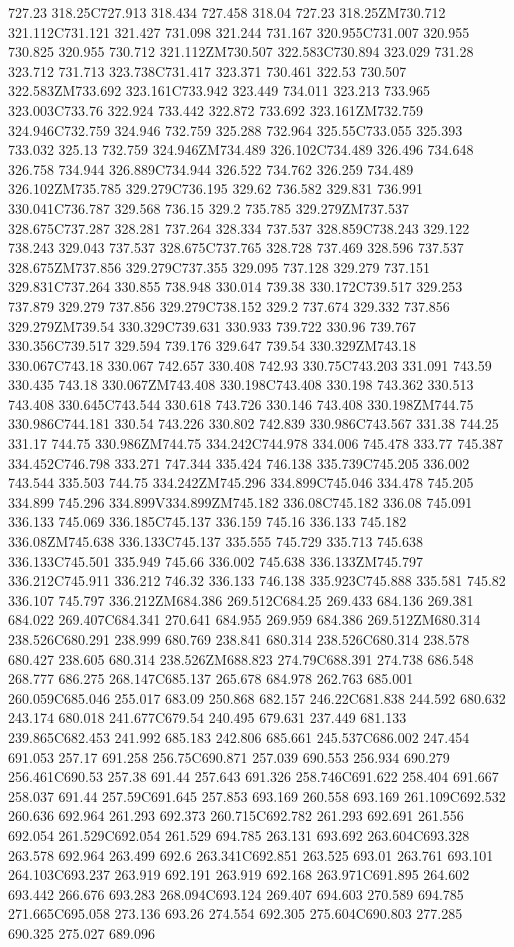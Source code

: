 727.23 318.25C727.913 318.434 727.458 318.04 727.23 318.25ZM730.712 321.112C731.121 321.427 731.098 321.244 731.167 320.955C731.007 320.955 730.825 320.955 730.712 321.112ZM730.507 322.583C730.894 323.029 731.28 323.712 731.713 323.738C731.417 323.371 730.461 322.53 730.507 322.583ZM733.692 323.161C733.942 323.449 734.011 323.213 733.965 323.003C733.76 322.924 733.442 322.872 733.692 323.161ZM732.759 324.946C732.759 324.946 732.759 325.288 732.964 325.55C733.055 325.393 733.032 325.13 732.759 324.946ZM734.489 326.102C734.489 326.496 734.648 326.758 734.944 326.889C734.944 326.522 734.762 326.259 734.489 326.102ZM735.785 329.279C736.195 329.62 736.582 329.831 736.991 330.041C736.787 329.568 736.15 329.2 735.785 329.279ZM737.537 328.675C737.287 328.281 737.264 328.334 737.537 328.859C738.243 329.122 738.243 329.043 737.537 328.675C737.765 328.728 737.469 328.596 737.537 328.675ZM737.856 329.279C737.355 329.095 737.128 329.279 737.151 329.831C737.264 330.855 738.948 330.014 739.38 330.172C739.517 329.253 737.879 329.279 737.856 329.279C738.152 329.2 737.674 329.332 737.856 329.279ZM739.54 330.329C739.631 330.933 739.722 330.96 739.767 330.356C739.517 329.594 739.176 329.647 739.54 330.329ZM743.18 330.067C743.18 330.067 742.657 330.408 742.93 330.75C743.203 331.091 743.59 330.435 743.18 330.067ZM743.408 330.198C743.408 330.198 743.362 330.513 743.408 330.645C743.544 330.618 743.726 330.146 743.408 330.198ZM744.75 330.986C744.181 330.54 743.226 330.802 742.839 330.986C743.567 331.38 744.25 331.17 744.75 330.986ZM744.75 334.242C744.978 334.006 745.478 333.77 745.387 334.452C746.798 333.271 747.344 335.424 746.138 335.739C745.205 336.002 743.544 335.503 744.75 334.242ZM745.296 334.899C745.046 334.478 745.205 334.899 745.296 334.899V334.899ZM745.182 336.08C745.182 336.08 745.091 336.133 745.069 336.185C745.137 336.159 745.16 336.133 745.182 336.08ZM745.638 336.133C745.137 335.555 745.729 335.713 745.638 336.133C745.501 335.949 745.66 336.002 745.638 336.133ZM745.797 336.212C745.911 336.212 746.32 336.133 746.138 335.923C745.888 335.581 745.82 336.107 745.797 336.212ZM684.386 269.512C684.25 269.433 684.136 269.381 684.022 269.407C684.341 270.641 684.955 269.959 684.386 269.512ZM680.314 238.526C680.291 238.999 680.769 238.841 680.314 238.526C680.314 238.578 680.427 238.605 680.314 238.526ZM688.823 274.79C688.391 274.738 686.548 268.777 686.275 268.147C685.137 265.678 684.978 262.763 685.001 260.059C685.046 255.017 683.09 250.868 682.157 246.22C681.838 244.592 680.632 243.174 680.018 241.677C679.54 240.495 679.631 237.449 681.133 239.865C682.453 241.992 685.183 242.806 685.661 245.537C686.002 247.454 691.053 257.17 691.258 256.75C690.871 257.039 690.553 256.934 690.279 256.461C690.53 257.38 691.44 257.643 691.326 258.746C691.622 258.404 691.667 258.037 691.44 257.59C691.645 257.853 693.169 260.558 693.169 261.109C692.532 260.636 692.964 261.293 692.373 260.715C692.782 261.293 692.691 261.556 692.054 261.529C692.054 261.529 694.785 263.131 693.692 263.604C693.328 263.578 692.964 263.499 692.6 263.341C692.851 263.525 693.01 263.761 693.101 264.103C693.237 263.919 692.191 263.919 692.168 263.971C691.895 264.602 693.442 266.676 693.283 268.094C693.124 269.407 694.603 270.589 694.785 271.665C695.058 273.136 693.26 274.554 692.305 275.604C690.803 277.285 690.325 275.027 689.096 